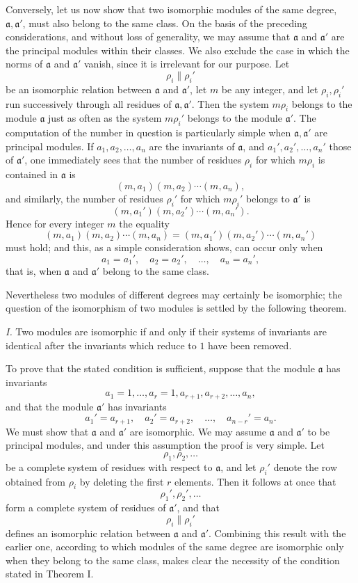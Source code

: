 \documentclass[11pt,a4paper]{article}
\begin{document}
Conversely, let us now show that two isomorphic modules of the same degree, $\mathfrak a,\mathfrak a'$, must also belong to the same class. On the basis of the preceding considerations, and without loss of generality, we may assume that $\mathfrak a$ and $\mathfrak a'$ are the principal modules within their classes. We also exclude the case in which the norms of $\mathfrak a$ and $\mathfrak a'$ vanish, since it is irrelevant for our purpose. Let
\[
 \rho_i\parallel \rho_i'
\]
be an isomorphic relation between $\mathfrak a$ and $\mathfrak a'$, let $m$ be any integer, and let $\rho_i,\rho_i'$ run successively through all residues of $\mathfrak a,\mathfrak a'$. Then the system $m\rho_i$ belongs to the module $\mathfrak a$ just as often as the system $m\rho_i'$ belongs to the module $\mathfrak a'$. The computation of the number in question is particularly simple when $\mathfrak a,\mathfrak a'$ are principal modules. If $a_1,a_2,\ldots,a_n$ are the invariants of $\mathfrak a$, and $a_1',a_2',\ldots,a_n'$ those of $\mathfrak a'$, one immediately sees that the number of residues $\rho_i$ for which $m\rho_i$ is contained in $\mathfrak a$ is
\[
 (m,a_1)(m,a_2)\cdots(m,a_n),
\]
and similarly, the number of residues $\rho_i'$ for which $m\rho_i'$ belongs to $\mathfrak a'$ is
\[
 (m,a_1')(m,a_2')\cdots(m,a_n').
\]
Hence for every integer $m$ the equality
\[
 (m,a_1)(m,a_2)\cdots(m,a_n)=(m,a_1')(m,a_2')\cdots(m,a_n')
\]
must hold; and this, as a simple consideration shows, can occur only when
\[
 a_1=a_1',\quad a_2=a_2',\quad\ldots,\quad a_n=a_n',
\]
that is, when $\mathfrak a$ and $\mathfrak a'$ belong to the same class.

Nevertheless two modules of different degrees may certainly be isomorphic; the question of the isomorphism of two modules is settled by the following theorem.

\emph{I.} Two modules are isomorphic if and only if their systems of invariants are identical after the invariants which reduce to $1$ have been removed.

To prove that the stated condition is sufficient, suppose that the module $\mathfrak a$ has invariants
\[
 a_1=1,\ldots,a_r=1,a_{r+1},a_{r+2},\ldots,a_n,
\]
and that the module $\mathfrak a'$ has invariants
\[
 a_1'=a_{r+1},\quad a_2'=a_{r+2},\quad\ldots,\quad a_{n-r}'=a_n.
\]
We must show that $\mathfrak a$ and $\mathfrak a'$ are isomorphic. We may assume $\mathfrak a$ and $\mathfrak a'$ to be principal modules, and under this assumption the proof is very simple. Let
\[
 \rho_1,\rho_2,\ldots
\]
be a complete system of residues with respect to $\mathfrak a$, and let $\rho_i'$ denote the row obtained from $\rho_i$ by deleting the first $r$ elements. Then it follows at once that
\[
 \rho_1',\rho_2',\ldots
\]
form a complete system of residues of $\mathfrak a'$, and that
\[
 \rho_i\parallel\rho_i'
\]
defines an isomorphic relation between $\mathfrak a$ and $\mathfrak a'$. Combining this result with the earlier one, according to which modules of the same degree are isomorphic only when they belong to the same class, makes clear the necessity of the condition stated in Theorem I.
\end{document}

